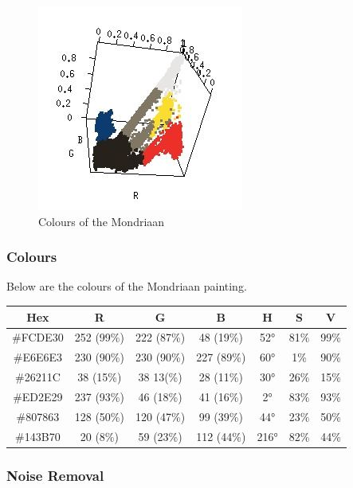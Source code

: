 \documentclass[12pt]{article}
\begin{document}
\begin{figure}[H]
\centering
\includegraphics[scale = 0.7]{img/mondriaan_colors}
\caption{Colours of the Mondriaan}
\label{mondriaan_colors}
\end{figure}

\subsubsection{Colours}

Below are the colours of the Mondriaan painting.
\newline

\begin{tabular}{| c | c | c | c | c | c | c |}
\hline
Hex & R & G & B & H & S & V \\
\hline
\#FCDE30 & 252 (99\%) & 222 (87\%) & 48 (19\%) & 52° & 81\% & 99\% \\ 
\hline
\#E6E6E3 & 230 (90\%) & 230 (90\%) & 227 (89\%) & 60° & 1\% & 90\% \\ 
\hline
\#26211C & 38 (15\%) & 38 13(\%) & 28 (11\%) & 30° & 26\% & 15\% \\ 
\hline
\#ED2E29 & 237 (93\%) & 46 (18\%) & 41 (16\%) & 2° & 83\% & 93\% \\ 
\hline
\#807863 & 128 (50\%) & 120 (47\%) & 99 (39\%) & 44° & 23\% & 50\% \\ 
\hline
\#143B70 & 20 (8\%) & 59 (23\%) & 112 (44\%) & 216° & 82\% & 44\% \\ 
\hline
\end{tabular}

\subsubsection{Noise Removal}


\newpage
\end{document}
